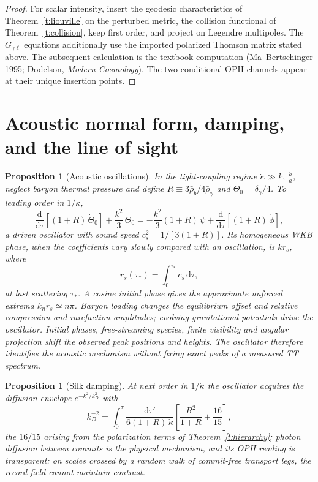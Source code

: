\documentclass[11pt]{article}
\newtheorem{proposition}[theorem]{Proposition}
\theoremstyle{remark}
\newcommand{\Dd}{\mathrm{d}}
\newcommand{\ah}{\frac{\dot a}{a}}
\newcommand{\kdot}{\dot\kappa}
\begin{document}
\begin{proof}
For scalar intensity, insert the geodesic characteristics of
Theorem~\ref{t:liouville} on the perturbed metric, the collision functional
of Theorem~\ref{t:collision}, keep first order, and project on Legendre
multipoles. The $G_{\gamma\ell}$ equations additionally use the imported
polarized Thomson matrix stated above. The subsequent calculation is the
textbook computation (Ma--Bertschinger 1995; Dodelson, \emph{Modern
Cosmology}). The two conditional OPH channels appear at their unique insertion
points.
\end{proof}

\section{Acoustic normal form, damping, and the line of sight}

\begin{proposition}[Acoustic oscillations]\label{p:acoustic}
In the tight-coupling regime $\kdot\gg k,\ \ah$, neglect baryon thermal
pressure and define
$R\equiv 3\bar\rho_b/4\bar\rho_\gamma$ and $\Theta_0=\delta_\gamma/4$. To
leading order in $1/\kdot$,
\[
\frac{\Dd}{\Dd\tau}\!\left[(1+R)\,\dot\Theta_0\right]
+\frac{k^2}{3}\,\Theta_0
=-\frac{k^2}{3}(1+R)\,\psi
+\frac{\Dd}{\Dd\tau}\!\left[(1+R)\,\dot\phi\right],
\]
a driven oscillator with sound speed $c_s^2=1/[3(1+R)]$. Its homogeneous
WKB phase, when the coefficients vary slowly compared with an oscillation,
is $k r_s$, where
\[
r_s(\tau_\ast)=\int_0^{\tau_\ast}\!c_s\,\Dd\tau,
\]
at last scattering $\tau_\ast$. A cosine initial phase gives the approximate
unforced extrema $k_n r_s\simeq n\pi$. Baryon loading changes the
equilibrium offset and relative compression and rarefaction amplitudes;
evolving gravitational potentials drive the oscillator. Initial phases,
free-streaming species, finite visibility and angular projection shift the
observed peak positions and heights. The oscillator therefore identifies the
acoustic mechanism without fixing exact peaks of a measured TT spectrum.
\end{proposition}

\begin{proposition}[Silk damping]\label{p:damping}
At next order in $1/\kdot$ the oscillator acquires the diffusion envelope
$e^{-k^2/k_D^2}$ with
\[
k_D^{-2}=\int_0^{\tau}\frac{\Dd\tau'}{6(1+R)\,\kdot}
\left[\frac{R^2}{1+R}+\frac{16}{15}\right],
\]
the $16/15$ arising from the polarization terms of
Theorem~\ref{t:hierarchy}; photon diffusion between commits is the physical
mechanism, and its OPH reading is transparent: on scales crossed by a random
walk of commit-free transport legs, the record field cannot maintain
contrast.
\end{proposition}
\end{document}
